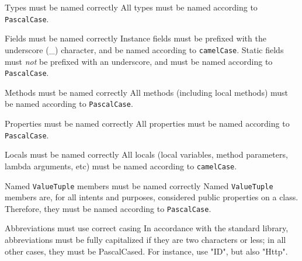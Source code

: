 \documentclass[11pt,a4paper]{article}
\begin{document}
\begin{must}{Types must be named correctly}
All types must be named according to \texttt{PascalCase}.
\end{must}

\begin{must}{Fields must be named correctly}
Instance fields must be prefixed with the underscore (\_) character, and be named according to \texttt{camelCase}.
Static fields must \textit{not} be prefixed with an underscore, and must be named according to \texttt{PascalCase}.
\end{must}

\begin{must}{Methods must be named correctly}
All methods (including local methods) must be named according to \texttt{PascalCase}.
\end{must}

\begin{must}{Properties must be named correctly}
All properties must be named according to \texttt{PascalCase}.
\end{must}

\begin{must}{Locals must be named correctly}
All locals (local variables, method parameters, lambda arguments, etc) must be named according to \texttt{camelCase}.
\end{must}

\begin{must}{Named \texttt{ValueTuple} members must be named correctly}
Named \texttt{ValueTuple} members are, for all intents and purposes, considered public properties on a class. Therefore, they must be named according to \texttt{PascalCase}.
\end{must}

\begin{must}{Abbreviations must use correct casing}
In accordance with the standard library, abbreviations must be fully capitalized if they are two characters or less; in all other cases, they must be PascalCased. For instance, use "ID", but also "Http".
\end{must}
\end{document}
